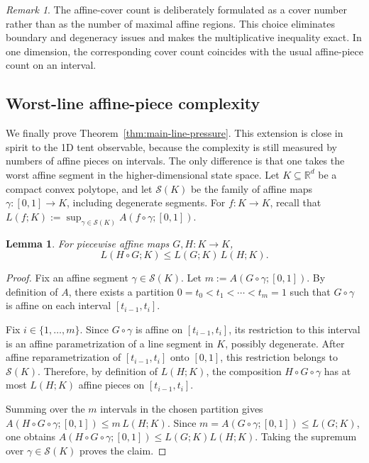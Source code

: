 \documentclass[11pt]{amsart}
\numberwithin{equation}{section}
\theoremstyle{plain}
\newtheorem{lemma}[theorem]{Lemma}
\theoremstyle{definition}
\theoremstyle{remark}
\newtheorem{remark}[theorem]{Remark}
\begin{document}
\begin{remark}
The affine-cover count is deliberately formulated as a cover number rather than as the number of maximal affine regions. This choice eliminates boundary and degeneracy issues and makes the multiplicative inequality exact. In one dimension, the corresponding cover count coincides with the usual affine-piece count on an interval.
\end{remark}

\subsection{Worst-line affine-piece complexity}

We finally prove Theorem~\ref{thm:main-line-pressure}. This extension is close in spirit to the 1D tent observable, because the complexity is still measured by numbers of affine pieces on intervals. The only difference is that one takes the worst affine segment in the higher-dimensional state space.
Let \(K\subseteq\mathbb R^d\) be a compact convex polytope, and let \(\mathcal S(K)\) be the family of affine maps \(\gamma:[0,1]\to K\), including degenerate segments. For \(f:K\to K\), recall that \(L(f;K):=\sup_{\gamma\in\mathcal S(K)}A(f\circ\gamma;[0,1])\).

\begin{lemma}\label{lem:submultiplicative-line}
For piecewise affine maps \(G,H:K\to K\),
\[
L(H\circ G;K)\le L(G;K)\,L(H;K).
\]
\end{lemma}

\begin{proof}
Fix an affine segment \(\gamma\in\mathcal S(K)\). Let \(m:=A(G\circ\gamma;[0,1])\). By definition of \(A\), there exists a partition \(0=t_0<t_1<\cdots<t_m=1\) such that \(G\circ\gamma\) is affine on each interval \([t_{i-1},t_i]\).

Fix \(i\in\{1,\dots,m\}\). Since \(G\circ\gamma\) is affine on \([t_{i-1},t_i]\), its restriction to this interval is an affine parametrization of a line segment in \(K\), possibly degenerate. After affine reparametrization of \([t_{i-1},t_i]\) onto \([0,1]\), this restriction belongs to \(\mathcal S(K)\). Therefore, by definition of \(L(H;K)\), the composition \(H\circ G\circ\gamma\) has at most \(L(H;K)\) affine pieces on \([t_{i-1},t_i]\).

Summing over the \(m\) intervals in the chosen partition gives \(A(H\circ G\circ\gamma;[0,1])\le m\,L(H;K)\). Since \(m=A(G\circ\gamma;[0,1])\le L(G;K)\), one obtains \(A(H\circ G\circ\gamma;[0,1])\le L(G;K)L(H;K)\). Taking the supremum over \(\gamma\in\mathcal S(K)\) proves the claim.
\end{proof}
\end{document}
